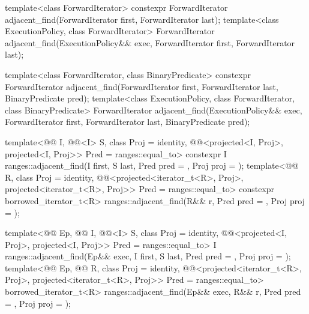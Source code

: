 %
\begin{itemdecl}
template<class ForwardIterator>
  constexpr ForwardIterator
    adjacent_find(ForwardIterator first, ForwardIterator last);
template<class ExecutionPolicy, class ForwardIterator>
  ForwardIterator
    adjacent_find(ExecutionPolicy&& exec,
                  ForwardIterator first, ForwardIterator last);

template<class ForwardIterator, class BinaryPredicate>
  constexpr ForwardIterator
    adjacent_find(ForwardIterator first, ForwardIterator last,
                  BinaryPredicate pred);
template<class ExecutionPolicy, class ForwardIterator, class BinaryPredicate>
  ForwardIterator
    adjacent_find(ExecutionPolicy&& exec,
                  ForwardIterator first, ForwardIterator last,
                  BinaryPredicate pred);

template<@@ I, @@<I> S, class Proj = identity,
         @@<projected<I, Proj>,
                                   projected<I, Proj>> Pred = ranges::equal_to>
  constexpr I ranges::adjacent_find(I first, S last, Pred pred = {}, Proj proj = {});
template<@@ R, class Proj = identity,
         @@<projected<iterator_t<R>, Proj>,
                                   projected<iterator_t<R>, Proj>> Pred = ranges::equal_to>
  constexpr borrowed_iterator_t<R> ranges::adjacent_find(R&& r, Pred pred = {}, Proj proj = {});

template<@@ Ep, @@ I, @@<I> S,
         class Proj = identity,
         @@<projected<I, Proj>,
                                    projected<I, Proj>> Pred = ranges::equal_to>
  I ranges::adjacent_find(Ep&& exec, I first, S last, Pred pred = {}, Proj proj = {});
template<@@ Ep, @@ R, class Proj = identity,
         @@<projected<iterator_t<R>, Proj>,
                                    projected<iterator_t<R>, Proj>> Pred = ranges::equal_to>
  borrowed_iterator_t<R>
    ranges::adjacent_find(Ep&& exec, R&& r, Pred pred = {}, Proj proj = {});
\end{itemdecl}

